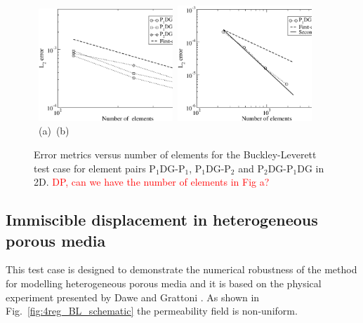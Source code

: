 \documentclass[times]{fldauth}
\newcommand{\PN}[2][error]{P$_{#1}$DG-P$_{#2}$}
\newcommand{\red}{\textcolor{red}}
\begin{document}
\begin{figure}[h!]
  \begin{center}
    \vbox{\hbox{
        \hspace{0.0cm}\includegraphics[width=0.45\textwidth]{Conv1.eps} 
        \hspace{0.0cm}\includegraphics[width=0.45\textwidth]{Conv2.eps}}
      \hbox{
        \vspace{-0.cm}\hbox{\hspace{3.0cm}(a)} 
        \vspace{-0.cm}\hbox{\hspace{6.0cm}(b)}}}
    \caption{Error metrics versus number of elements for the
      Buckley-Leverett test case for element pairs \PN[1]{1},
      \PN[1]{2} and \PN[2]{1}DG in 2D. \red{DP, can we have the number of elements in Fig a?}\label{fig:errors_BL_2D}}
  \end{center}
\end{figure}



\subsection{Immiscible displacement in heterogeneous porous media}\label{res2}

This test case is designed to demonstrate the numerical robustness of the method for modelling heterogeneous porous media and it is based on the physical experiment presented by Dawe and Grattoni \cite{dawe_2008}. As shown in Fig.~\ref{fig:4reg_BL_schematic} the permeability field is non-uniform.
\end{document}

